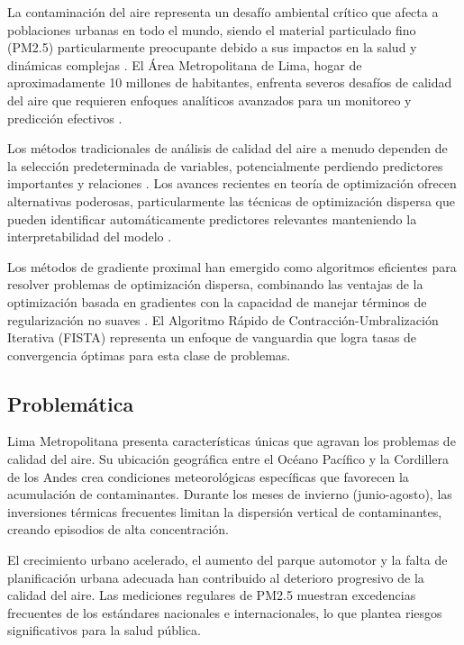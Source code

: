\documentclass[conference]{IEEEtran}
\begin{document}
La contaminación del aire representa un desafío ambiental crítico que afecta a poblaciones urbanas en todo el mundo, siendo el material particulado fino (PM2.5) particularmente preocupante debido a sus impactos en la salud y dinámicas complejas \cite{who2021}. El Área Metropolitana de Lima, hogar de aproximadamente 10 millones de habitantes, enfrenta severos desafíos de calidad del aire que requieren enfoques analíticos avanzados para un monitoreo y predicción efectivos \cite{tapia2020}.

Los métodos tradicionales de análisis de calidad del aire a menudo dependen de la selección predeterminada de variables, potencialmente perdiendo predictores importantes y relaciones \cite{mendez2023}. Los avances recientes en teoría de optimización ofrecen alternativas poderosas, particularmente las técnicas de optimización dispersa que pueden identificar automáticamente predictores relevantes manteniendo la interpretabilidad del modelo \cite{parikh2014}.

Los métodos de gradiente proximal han emergido como algoritmos eficientes para resolver problemas de optimización dispersa, combinando las ventajas de la optimización basada en gradientes con la capacidad de manejar términos de regularización no suaves \cite{beck2009}. El Algoritmo Rápido de Contracción-Umbralización Iterativa (FISTA) representa un enfoque de vanguardia que logra tasas de convergencia óptimas para esta clase de problemas.

\subsection{Problemática}

Lima Metropolitana presenta características únicas que agravan los problemas de calidad del aire. Su ubicación geográfica entre el Océano Pacífico y la Cordillera de los Andes crea condiciones meteorológicas específicas que favorecen la acumulación de contaminantes. Durante los meses de invierno (junio-agosto), las inversiones térmicas frecuentes limitan la dispersión vertical de contaminantes, creando episodios de alta concentración.

El crecimiento urbano acelerado, el aumento del parque automotor y la falta de planificación urbana adecuada han contribuido al deterioro progresivo de la calidad del aire. Las mediciones regulares de PM2.5 muestran excedencias frecuentes de los estándares nacionales e internacionales, lo que plantea riesgos significativos para la salud pública.
\end{document}
